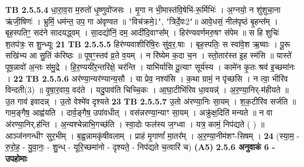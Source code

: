 \documentclass[17pt]{extarticle}
\begin{document}
                  \newline
                                \textbf{ TB 2.5.5.4} \newline
                  धा॒रा॒व॒रा म॒रुतो॑ धृ॒ष्णुवो॑जसः । मृ॒गा न भी॒मास्त॑वि॒षेभि॑-रू॒र्मिभिः॑ । अ॒ग्नयो॒ न शु॑शुचा॒ना ऋ॑जी॒षिणः॑ । भ्रुमिं॒ धम॑न्त॒ उप॒ गा अ॑वृण्वत ॥ "विच॑क्रमे॒{1}", "त्रिर्दे॒वः{2}"॥ आवे॒धसं॒ नील॑पृष्ठं बृ॒हन्त᳚म् । बृह॒स्पतिꣳ॒॒ सद॑ने सादयद्ध्वम् । सा॒दद्यो॑निं॒ दम॒ आदी॑दि॒वाꣳस᳚म् । हिर॑ण्यवर्णमरु॒षꣳ स॑पेम ॥ स हि शुचिः॑ श॒तप॑त्रः॒ स शु॒न्ध्यूः \textbf{ 21} \newline
                  \newline
                                \textbf{ TB 2.5.5.5} \newline
                  हिर॑ण्यवाशीरिषि॒रः सु॑व॒र॒.षाः । बृह॒स्पतिः॒ स स्वा॑वे॒श ऋ॒ष्वाः । पू॒रू सखि॑भ्य आ सु॒तिं क॑रिष्ठः ॥ पूषꣳ॒॒स्तव॑ व्र॒ते व॒यम् । न रि॑ष्येम क॒दा च॒न । स्तो॒तार॑स्त इ॒ह स्म॑सि ॥ यास्ते॑ पूष॒न्नावो॑ अ॒न्तः स॑मु॒द्रे । हि॒र॒ण्ययी॑र॒न्तरि॑क्षे॒ चर॑न्ति । याभि॑र्यासि दू॒त्याꣳ सूर्य॑स्य । कामे॑न कृ॒तः श्रव॑ इ॒च्छमा॑नः । \textbf{ 22} \newline
                  \newline
                                \textbf{ TB 2.5.5.6} \newline
                  अर॑ण्या॒न्यर॑ण्यान्य॒सौ । या प्रेव॒ नश्य॑सि । क॒था ग्रामं॒ न पृ॑च्छसि । न त्वा॒ भीरि॑व विन्दती(3) ॥ वृ॒षा॒र॒वाय॒ वद॑ते । यदु॒पाव॑ति चिच्चि॒कः । आ॒घा॒टीभि॑रिव धा॒वयन्न्॑ । अ॒र॒ण्या॒निर्-म॑हीयते ॥ उ॒त गाव॑ इवादन्न् । उ॒तो वेश्मे॑व दृश्यते \textbf{ 23} \newline
                  \newline
                                \textbf{ TB 2.5.5.7} \newline
                  उ॒तो अ॑रण्या॒निः सा॒यम् । श॒क॒टीरि॑व सर्जति ॥ गाम॒ङ्गैष॒ आह्व॑यति । दार्व॒ङ्गैष॒ उपा॑वधीत् । वस॑न्नरण्या॒न्याꣳ सा॒यम् । अक्रु॑क्ष॒दिति॑ मन्यते ॥ न वा अ॑रण्या॒निर्.ह॑न्ति । अ॒न्यश्चेन्नाभि॒गच्छ॑ति । स्वा॒दोः फल॑स्य ज॒ग्ध्वा । यत्र॒ कामं॒ निप॑द्यते ( ) ॥ आञ्ज॑नगन्धीꣳ सुर॒भीम् । ब॒ह्व॒न्नामकृ॑षीवलाम् । प्राहं मृ॒गाणां᳚ मा॒तर᳚म् । अ॒र॒ण्या॒नीम॑शꣳ-सिषम् । \textbf{ 24} \newline
                  \newline
                                    (स्या॒म॒ - रु॒रो॒ह॒ - यु॒वा॒नः॒ - शु॒न्ध् - यूरि॒च्छमा॑नो - दृश्यते॒ - निप॑द्यते च॒त्वारि॑ च) \textbf{(A5)} \newline \newline
                \textbf{ 2.5.6     अनुवाकं   6 -  उपहोमाः} \newline
\end{document}
